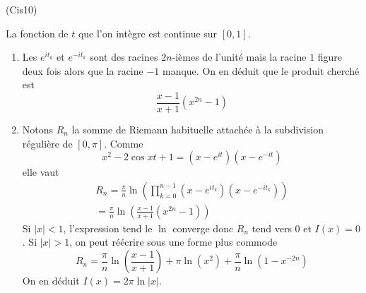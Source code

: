 \begin{tiny}(Cis10)\end{tiny} La fonction de $t$ que l'on intègre est continue sur $[0,1]$.
\begin{enumerate}
 \item Les $e^{it_k}$ et $e^{-it_k}$ sont des racines $2n$-ièmes de l'unité mais la racine $1$ figure deux fois alors que la racine $-1$ manque. On en déduit que le produit cherché est
\begin{displaymath}
 \frac{x-1}{x+1}(x^{2n}-1)
\end{displaymath}
\item Notons $R_n$ la somme de Riemann habituelle attachée à la subdivision régulière de $[0,\pi]$. Comme
\begin{displaymath}
 x^2-2\cos x t+ 1 = (x-e^{it})(x-e^{-it})
\end{displaymath}
elle vaut
\begin{multline*}
 R_n = \frac{\pi}{n}\ln \left(\prod_{k=0}^{n-1}(x-e^{it_k})(x-e^{-it_k}) \right) \\
= \frac{\pi}{n}\ln \left(\frac{x-1}{x+1}(x^{2n}-1)\right) 
\end{multline*}
Si $|x|<1$, l'expression tend le $\ln$ converge donc $R_n$ tend vers $0$ et $I(x)=0$.\newline
Si $|x|>1$, on peut réécrire sous une forme plus commode
\begin{displaymath}
 R_n = \frac{\pi}{n}\ln \left(\frac{x-1}{x+1}\right) + \pi\ln(x^2) +\frac{\pi}{n}\ln(1-x^{-2n})
\end{displaymath}
On en déduit $I(x)=2\pi \ln|x|$.
\end{enumerate}

